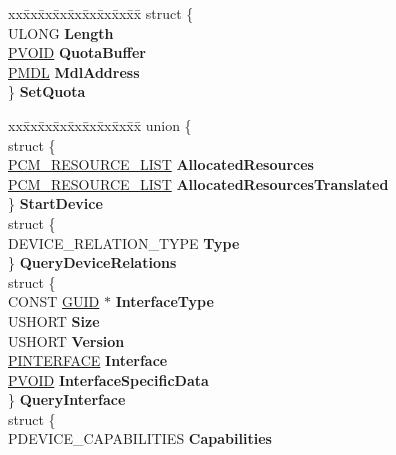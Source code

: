\begin{DoxyCompactItemize}
\begin{tabbing}
\end{tabbing}\item 
\mbox{\label{union___f_l_t___p_a_r_a_m_e_t_e_r_s_a98ca00d32e614e37192319127d4caeee}} 
\begin{tabbing}
xx\=xx\=xx\=xx\=xx\=xx\=xx\=xx\=xx\=\kill
struct \{\\
\>ULONG {\bfseries Length}\\
\>\hyperlink{interfacevoid}{PVOID} {\bfseries QuotaBuffer}\\
\>\hyperlink{interfacevoid}{PMDL} {\bfseries MdlAddress}\\
\} {\bfseries SetQuota}\\

\end{tabbing}\item 
\mbox{\label{union___f_l_t___p_a_r_a_m_e_t_e_r_s_a32df65500a0d36ffd8be19eb550bdfd6}} 
\begin{tabbing}
xx\=xx\=xx\=xx\=xx\=xx\=xx\=xx\=xx\=\kill
union \{\\
\>struct \{\\
\>\>\hyperlink{struct___c_m___r_e_s_o_u_r_c_e___l_i_s_t}{PCM\_RESOURCE\_LIST} {\bfseries AllocatedResources}\\
\>\>\hyperlink{struct___c_m___r_e_s_o_u_r_c_e___l_i_s_t}{PCM\_RESOURCE\_LIST} {\bfseries AllocatedResourcesTranslated}\\
\>\} {\bfseries StartDevice}\\
\>struct \{\\
\>\>DEVICE\_RELATION\_TYPE {\bfseries Type}\\
\>\} {\bfseries QueryDeviceRelations}\\
\>struct \{\\
\>\>CONST \hyperlink{interface_g_u_i_d}{GUID} $\ast$ {\bfseries InterfaceType}\\
\>\>USHORT {\bfseries Size}\\
\>\>USHORT {\bfseries Version}\\
\>\>\hyperlink{struct___i_n_t_e_r_f_a_c_e}{PINTERFACE} {\bfseries Interface}\\
\>\>\hyperlink{interfacevoid}{PVOID} {\bfseries InterfaceSpecificData}\\
\>\} {\bfseries QueryInterface}\\
\>struct \{\\
\>\>PDEVICE\_CAPABILITIES {\bfseries Capabilities}\\

\end{tabbing}
\end{DoxyCompactItemize}
